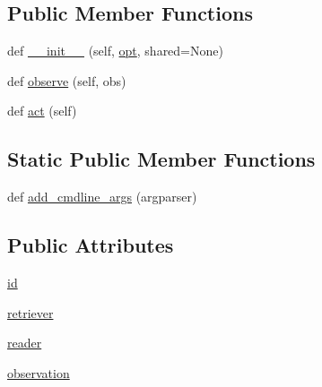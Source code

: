 \subsection*{Public Member Functions}
\begin{DoxyCompactItemize}
\item 
def \hyperlink{classparlai_1_1agents_1_1retriever__reader_1_1retriever__reader_1_1RetrieverReaderAgent_a7777973d732eccc4a630116d8a9462f1}{\+\_\+\+\_\+init\+\_\+\+\_\+} (self, \hyperlink{classparlai_1_1core_1_1agents_1_1Agent_ab3b45d2754244608c75d4068b90cd051}{opt}, shared=None)
\item 
def \hyperlink{classparlai_1_1agents_1_1retriever__reader_1_1retriever__reader_1_1RetrieverReaderAgent_a093b0a679a2cc8a09ed3a4ae314362b1}{observe} (self, obs)
\item 
def \hyperlink{classparlai_1_1agents_1_1retriever__reader_1_1retriever__reader_1_1RetrieverReaderAgent_a26f155f699b7a345b3f995b09e049a97}{act} (self)
\end{DoxyCompactItemize}
\subsection*{Static Public Member Functions}
\begin{DoxyCompactItemize}
\item 
def \hyperlink{classparlai_1_1agents_1_1retriever__reader_1_1retriever__reader_1_1RetrieverReaderAgent_aa2c30c066bf3cf8413fd7fbc4d7de0e1}{add\+\_\+cmdline\+\_\+args} (argparser)
\end{DoxyCompactItemize}
\subsection*{Public Attributes}
\begin{DoxyCompactItemize}
\item 
\hyperlink{classparlai_1_1agents_1_1retriever__reader_1_1retriever__reader_1_1RetrieverReaderAgent_ad509b6894625808427a677995488c385}{id}
\item 
\hyperlink{classparlai_1_1agents_1_1retriever__reader_1_1retriever__reader_1_1RetrieverReaderAgent_a5695be3aea22476bb07b09c4a76e5b5d}{retriever}
\item 
\hyperlink{classparlai_1_1agents_1_1retriever__reader_1_1retriever__reader_1_1RetrieverReaderAgent_a5ebf10c780f576b8e6b481a207a3b6ce}{reader}
\item 
\hyperlink{classparlai_1_1agents_1_1retriever__reader_1_1retriever__reader_1_1RetrieverReaderAgent_ab93ead9cf1fcab11b471b9e025b5652c}{observation}
\end{DoxyCompactItemize}


